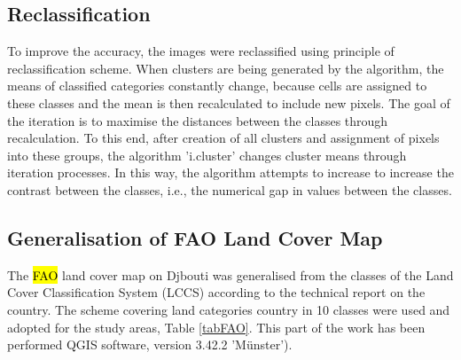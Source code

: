 \documentclass[jimaging,article,submit,pdftex,moreauthors]{Definitions/mdpi}
\begin{document}
\subsection{Reclassification}

{To improve} the accuracy, the images were reclassified using principle of reclassification scheme. {When clusters are being generated by the algorithm, the means of classified categories constantly change, because cells are assigned to these classes and the mean is then recalculated to include new pixels. The goal of the iteration is to maximise the distances between the classes through recalculation. To this end, after creation of all clusters and assignment of pixels into these groups, the algorithm 'i.cluster' changes cluster means through iteration processes. In this way, the algorithm attempts to increase to increase the contrast between the classes, i.e., the numerical gap in values between the classes.}

\subsection{{Generalisation of FAO Land Cover Map}}

{The \hl{FAO} land cover map on Djbouti was generalised from the classes of the Land Cover Classification System (LCCS) according to the technical report on the country. The scheme covering land categories country in 10 classes were used and adopted for the study areas, Table} \ref{tabFAO}. This part of the work has been performed QGIS software, version 3.42.2 'M\"unster'). 
\end{document}
